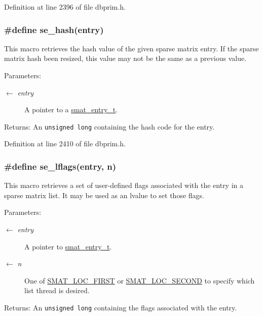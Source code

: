 Definition at line 2396 of file dbprim.h.\hypertarget{group__dbprim__smat_ga59}{
\subsubsection[se\_\-hash]{\setlength{\rightskip}{0pt plus 5cm}\#define se\_\-hash(entry)}}
\label{group__dbprim__smat_ga59}


This macro retrieves the hash value of the given sparse matrix entry. If the sparse matrix hash been resized, this value may not be the same as a previous value.

\begin{Desc}
\item[Parameters:]
\begin{description}
\item[\mbox{$\leftarrow$} {\em entry}]A pointer to a \hyperlink{group__dbprim__smat_ga2}{smat\_\-entry\_\-t}.\end{description}
\end{Desc}
\begin{Desc}
\item[Returns:]An {\tt unsigned long} containing the hash code for the entry.\end{Desc}


Definition at line 2410 of file dbprim.h.\hypertarget{group__dbprim__smat_ga64}{
\subsubsection[se\_\-lflags]{\setlength{\rightskip}{0pt plus 5cm}\#define se\_\-lflags(entry, n)}}
\label{group__dbprim__smat_ga64}


This macro retrieves a set of user-defined flags associated with the entry in a sparse matrix list. It may be used as an lvalue to set those flags.

\begin{Desc}
\item[Parameters:]
\begin{description}
\item[\mbox{$\leftarrow$} {\em entry}]A pointer to \hyperlink{group__dbprim__smat_ga2}{smat\_\-entry\_\-t}. \item[\mbox{$\leftarrow$} {\em n}]One of \hyperlink{group__dbprim__smat_gga70a137}{SMAT\_\-LOC\_\-FIRST} or \hyperlink{group__dbprim__smat_gga70a138}{SMAT\_\-LOC\_\-SECOND} to specify which list thread is desired.\end{description}
\end{Desc}
\begin{Desc}
\item[Returns:]An {\tt unsigned long} containing the flags associated with the entry.\end{Desc}


